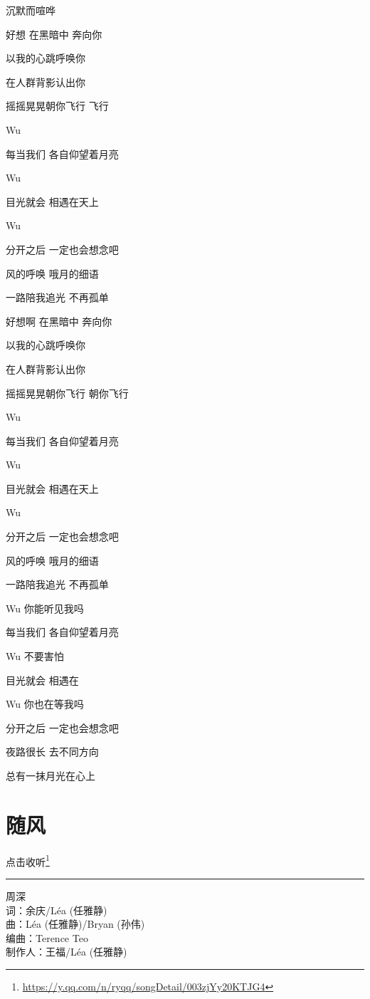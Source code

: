 \documentclass[]{ctexbook}
\renewcommand{\href}[2]{#2\footnote{\url{#1}}}
\begin{document}
沉默而喧哗

好想 在黑暗中 奔向你

以我的心跳呼唤你

在人群背影认出你

摇摇晃晃朝你飞行 飞行

Wu

每当我们 各自仰望着月亮

Wu

目光就会 相遇在天上

Wu

分开之后 一定也会想念吧

风的呼唤 哦月的细语

一路陪我追光 不再孤单

好想啊 在黑暗中 奔向你

以我的心跳呼唤你

在人群背影认出你

摇摇晃晃朝你飞行 朝你飞行

Wu

每当我们 各自仰望着月亮

Wu

目光就会 相遇在天上

Wu

分开之后 一定也会想念吧

风的呼唤 哦月的细语

一路陪我追光 不再孤单

Wu 你能听见我吗

每当我们 各自仰望着月亮

Wu 不要害怕

目光就会 相遇在

Wu 你也在等我吗

分开之后 一定也会想念吧

夜路很长 去不同方向

总有一抹月光在心上

\section*{随风}\label{with-wind}


\href{https://y.qq.com/n/ryqq/songDetail/003zjYy20KTJG4}{点击收听}

\begin{center}\rule{0.5\linewidth}{0.5pt}\end{center}

周深\\
词：余庆/Léa (任雅静)\\
曲：Léa (任雅静)/Bryan (孙伟)\\
编曲：Terence Teo\\
制作人：王福/Léa (任雅静)
\end{document}
